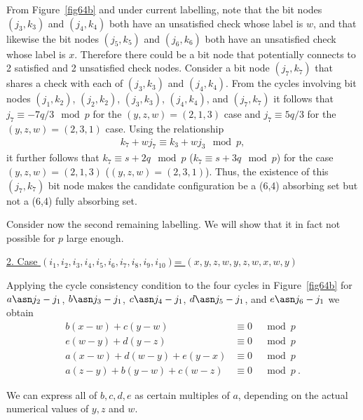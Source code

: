 {From Figure~\ref{fig64b} and under current labelling, note that
the bit nodes $(j_3,k_3)$ and $(j_4,k_4)$ both have an unsatisfied
check whose label is $w$, and that likewise the bit nodes
$(j_5,k_5)$ and $(j_6,k_6)$ both have an unsatisfied check whose
label is $x$. Therefore there could be a bit node that potentially
connects to 2 satisfied and 2 unsatisfied check nodes. Consider a
bit node $(j_7,k_7)$ that shares a check with each of $(j_3,k_3)$
and $(j_4,k_4)$. From the cycles involving bit nodes $(j_1,k_2)$,
$(j_2,k_2)$, $(j_3,k_3)$, $(j_4,k_4)$, and $(j_7,k_7)$ it follows
that $j_7 \equiv -7q/3 \mod p$ for the $(y,z,w)=(2,1,3)$ case and
$j_7 \equiv 5q/3$ for the $(y,z,w)=(2,3,1)$ case. Using the
relationship
\begin{eqnarray*}
k_7 +wj_7 \equiv k_3+wj_3 \mod p,
\end{eqnarray*}
it further follows that $k_7 \equiv s+2q \mod p$  ($k_7 \equiv
s+3q \mod p$) for the case $(y,z,w)=(2,1,3)$ ($(y,z,w)=(2,3,1)$).
Thus, the existence of this $(j_7,k_7)$ bit node makes the
candidate configuration be a (6,4) absorbing set but not a (6,4)
fully absorbing set.}

 Consider now the second remaining labelling. We will show that it
 in fact not possible for $p$ large enough.

\underline{2. Case $(i_1,i_2,i_3,i_4,i_5,i_6,i_7,i_8,i_9,i_{10})$=
$(x,y,z,w,y,z,w,x,w,y)$}  

Applying  the cycle consistency condition to the four cycles in
Figure~\ref{fig64b} for $a \asn j_2-j_1$, $b \asn j_3-j_1$, $c
\asn j_4-j_1$, $d \asn j_5-j_1$,  and $e \asn j_6-j_1$ we obtain
\begin{equation}\label{sys33}\begin{array}{cccc}
 b(x-w)+c(y-w) &\equiv 0 &\mod p\\
 e(w-y)+d(y-z) &\equiv 0 &\mod p\\
 a(x-w)+d(w-y)+e(y-x) &\equiv 0 &\mod p\\
 a(z-y)+b(y-w)+c(w-z) &\equiv 0 &\mod p~.
 \end{array}\end{equation}

We can express all of $b,c,d,e$ as certain multiples of
 $a$, depending on the actual numerical values of $y,z$ and $w$.

